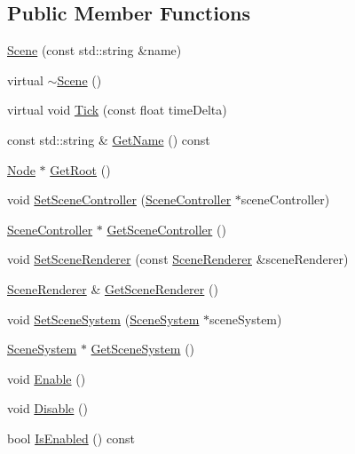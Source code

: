 \subsection*{Public Member Functions}
\begin{DoxyCompactItemize}
\item 
\mbox{\hyperlink{classec_1_1_scene_ad137e70b44b44f22b3e68d50671e9989}{Scene}} (const std\+::string \&name)
\item 
virtual \mbox{\hyperlink{classec_1_1_scene_a25e849d1bd5a9a71af922c3668115cb6}{$\sim$\+Scene}} ()
\item 
virtual void \mbox{\hyperlink{classec_1_1_scene_a07895d944a6045fa0ce5712b6a020c91}{Tick}} (const float time\+Delta)
\item 
const std\+::string \& \mbox{\hyperlink{classec_1_1_scene_a1646cecfcece12eec99d904a4351d21c}{Get\+Name}} () const
\item 
\mbox{\hyperlink{classec_1_1_node}{Node}} $\ast$ \mbox{\hyperlink{classec_1_1_scene_aa2c014fb59f0b51abe5de601a93297d5}{Get\+Root}} ()
\item 
void \mbox{\hyperlink{classec_1_1_scene_a67660c99962c9e12280937dcbbfd2102}{Set\+Scene\+Controller}} (\mbox{\hyperlink{classec_1_1_scene_controller}{Scene\+Controller}} $\ast$scene\+Controller)
\item 
\mbox{\hyperlink{classec_1_1_scene_controller}{Scene\+Controller}} $\ast$ \mbox{\hyperlink{classec_1_1_scene_ac3e1522d93014a5f19193cc3d173d64a}{Get\+Scene\+Controller}} ()
\item 
void \mbox{\hyperlink{classec_1_1_scene_a3f300f8210249e457121aa0696261b4e}{Set\+Scene\+Renderer}} (const \mbox{\hyperlink{classec_1_1_scene_renderer}{Scene\+Renderer}} \&scene\+Renderer)
\item 
\mbox{\hyperlink{classec_1_1_scene_renderer}{Scene\+Renderer}} \& \mbox{\hyperlink{classec_1_1_scene_a79d67056a8b73bf78e37e5d8951363f5}{Get\+Scene\+Renderer}} ()
\item 
void \mbox{\hyperlink{classec_1_1_scene_a24962dd137eba3192c3e88e597c7d03d}{Set\+Scene\+System}} (\mbox{\hyperlink{classec_1_1_scene_system}{Scene\+System}} $\ast$scene\+System)
\item 
\mbox{\hyperlink{classec_1_1_scene_system}{Scene\+System}} $\ast$ \mbox{\hyperlink{classec_1_1_scene_ae9e6923ee710a8b597e1996d1275d4fa}{Get\+Scene\+System}} ()
\item 
void \mbox{\hyperlink{classec_1_1_scene_a2c6d246942f97119f1a09a85e8175146}{Enable}} ()
\item 
void \mbox{\hyperlink{classec_1_1_scene_acd8a7b83227f99d595e9c6ee9592fc56}{Disable}} ()
\item 
bool \mbox{\hyperlink{classec_1_1_scene_a404676c2a1c87875b97c2c8942292f65}{Is\+Enabled}} () const
\end{DoxyCompactItemize}
